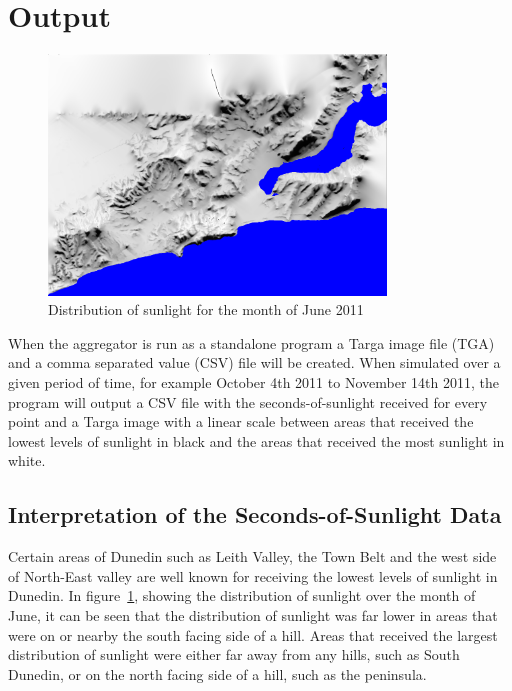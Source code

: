 \documentclass[12pt]{report}
\newcommand{\note}[1]{}
\newcommand{\notedme}[1]{}
\begin{document}
\section{Output}

\begin{figure}[h]
\centering
\includegraphics[width=0.8\textwidth]{june.png}
\caption{Distribution of sunlight for the month of June 2011}
\label{image:aggregator-targa-output}
\end{figure}

\notedme{This figure is fantastic! :-)}
When the aggregator is run as a standalone program a Targa image file (TGA) and a comma separated value (CSV) file will be created. When simulated over a given period of time, for example October 4th 2011 to November 14th 2011,\notedme{not clear if you mean simulation time or wall-clock time - obviously simulation time}\note{fixed} the program will output a CSV file with the seconds-of-sunlight received for every point and a Targa image with a linear scale between areas that received the lowest levels of sunlight in black and the areas that received the most sunlight in white.\notedme{linear scale? if so, say so}\note{fixed}

\subsection{Interpretation of the Seconds-of-Sunlight Data}

Certain areas of Dunedin such as Leith Valley, the Town Belt and the west side of North-East valley are well known for receiving the lowest levels of sunlight in Dunedin. In figure~\ref{image:aggregator-targa-output}, showing the distribution of sunlight over the month of June, it can be seen that the distribution of sunlight was far lower in areas that were on or nearby the south facing side of a hill. Areas that received the largest distribution of sunlight were either far away from any hills, such as South Dunedin, or on the north facing side of a hill, such as the peninsula.
\end{document}
